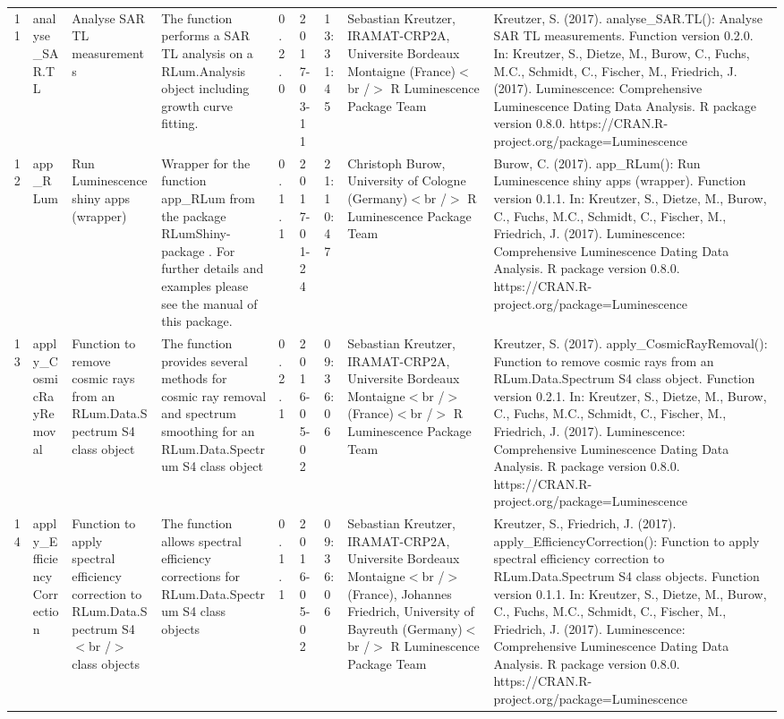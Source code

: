 \begin{table}[ht]
\begin{tabular}{rllllllll}
 \\ 
  11 & analyse\_SAR.TL & Analyse SAR TL measurements & The function performs a SAR TL analysis on a RLum.Analysis  object including growth curve fitting. & 0.2.0 & 2017-03-11 & 13:31:45
 & Sebastian Kreutzer, IRAMAT-CRP2A, Universite Bordeaux Montaigne (France)$<$br /$>$  R Luminescence Package Team & Kreutzer, S. (2017). analyse\_SAR.TL(): Analyse SAR TL measurements. Function version 0.2.0. In: Kreutzer, S., Dietze, M., Burow, C., Fuchs, M.C., Schmidt, C., Fischer, M., Friedrich, J. (2017). Luminescence: Comprehensive Luminescence Dating Data Analysis. R package version 0.8.0. https://CRAN.R-project.org/package=Luminescence
 \\ 
  12 & app\_RLum & Run Luminescence shiny apps (wrapper) & Wrapper for the function  app\_RLum  from the package RLumShiny-package . For further details and examples please see the manual of this package. & 0.1.1 & 2017-01-24 & 21:10:47
 & Christoph Burow, University of Cologne (Germany)$<$br /$>$  R Luminescence Package Team & Burow, C. (2017). app\_RLum(): Run Luminescence shiny apps (wrapper). Function version 0.1.1. In: Kreutzer, S., Dietze, M., Burow, C., Fuchs, M.C., Schmidt, C., Fischer, M., Friedrich, J. (2017). Luminescence: Comprehensive Luminescence Dating Data Analysis. R package version 0.8.0. https://CRAN.R-project.org/package=Luminescence
 \\ 
  13 & apply\_CosmicRayRemoval & Function to remove cosmic rays from an RLum.Data.Spectrum S4 class object & The function provides several methods for cosmic ray removal and spectrum smoothing for an RLum.Data.Spectrum S4 class object & 0.2.1 & 2016-05-02 & 09:36:06
 & Sebastian Kreutzer, IRAMAT-CRP2A, Universite Bordeaux Montaigne$<$br /$>$ (France)$<$br /$>$  R Luminescence Package Team & Kreutzer, S. (2017). apply\_CosmicRayRemoval(): Function to remove cosmic rays from an RLum.Data.Spectrum S4 class object. Function version 0.2.1. In: Kreutzer, S., Dietze, M., Burow, C., Fuchs, M.C., Schmidt, C., Fischer, M., Friedrich, J. (2017). Luminescence: Comprehensive Luminescence Dating Data Analysis. R package version 0.8.0. https://CRAN.R-project.org/package=Luminescence
 \\ 
  14 & apply\_EfficiencyCorrection & Function to apply spectral efficiency correction to RLum.Data.Spectrum S4$<$br /$>$ class objects & The function allows spectral efficiency corrections for RLum.Data.Spectrum S4 class objects & 0.1.1 & 2016-05-02 & 09:36:06
 & Sebastian Kreutzer, IRAMAT-CRP2A, Universite Bordeaux Montaigne$<$br /$>$ (France),  Johannes Friedrich, University of Bayreuth (Germany)$<$br /$>$  R Luminescence Package Team & Kreutzer, S., Friedrich, J. (2017). apply\_EfficiencyCorrection(): Function to apply spectral efficiency correction to RLum.Data.Spectrum S4 class objects. Function version 0.1.1. In: Kreutzer, S., Dietze, M., Burow, C., Fuchs, M.C., Schmidt, C., Fischer, M., Friedrich, J. (2017). Luminescence: Comprehensive Luminescence Dating Data Analysis. R package version 0.8.0. https://CRAN.R-project.org/package=Luminescence

\end{tabular}
\end{table}
